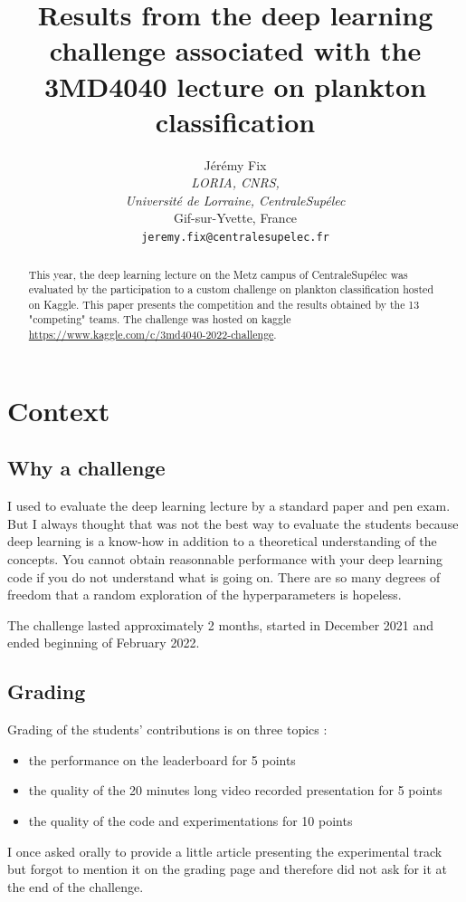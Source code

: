 \documentclass{article}
\title{Results from the deep learning challenge associated with the 3MD4040 lecture on plankton classification}
\author{%
Jérémy Fix\\
\textit{LORIA, CNRS,} \\
\textit{Université de Lorraine, CentraleSupélec}\\
Gif-sur-Yvette, France \\
\texttt{jeremy.fix@centralesupelec.fr}
}
\begin{document}
\maketitle

\begin{abstract}
	This year, the deep learning lecture on the Metz campus of CentraleSupélec was evaluated by the participation to a custom challenge on plankton classification hosted on Kaggle. This
	paper presents the competition and the results obtained by the 13 "competing"
	teams. The challenge was hosted on kaggle \url{https://www.kaggle.com/c/3md4040-2022-challenge}.
\end{abstract}

\section{Context}

\subsection{Why a challenge}

I used to evaluate the deep learning lecture by a standard paper and pen exam. But I always thought that was not the best way to evaluate the students because deep learning is a know-how in addition to a theoretical understanding of the concepts. You cannot obtain reasonnable performance with your deep learning code if you do not understand what is going on. There are so many degrees of freedom that a random exploration of the hyperparameters is hopeless.

The challenge lasted approximately 2 months, started in December 2021 and ended beginning of February 2022.

\subsection{Grading}

Grading of the students' contributions is on three topics :
\begin{itemize}
	\item the performance on the leaderboard for 5 points
	\item the quality of the 20 minutes long video recorded presentation for 5 points
	\item the quality of the code and experimentations for 10 points
\end{itemize}

I once asked orally to provide a little article presenting the experimental track but forgot to mention it on the grading page and therefore did not ask for it at the end of the challenge.
\end{document}
